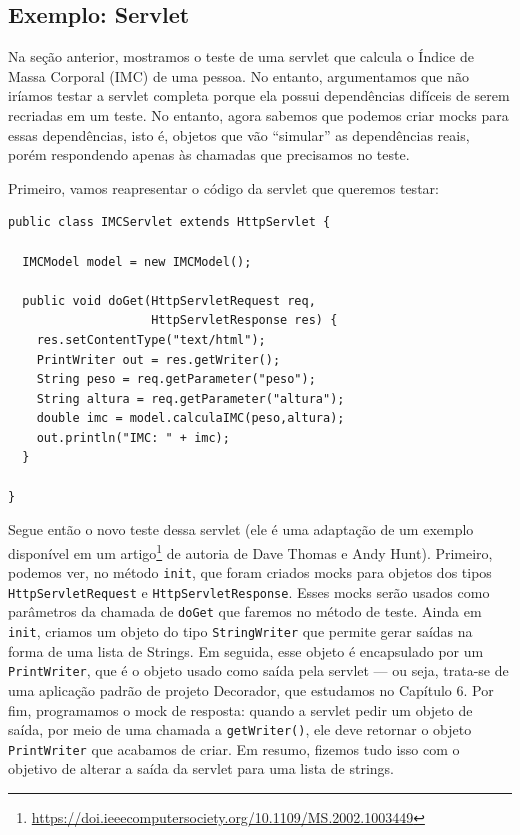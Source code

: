 \documentclass[
  11pt,
  twoside]{book}
\newcommand{\passthrough}[1]{#1}
\DeclareRobustCommand{\href}[2]{#2\footnote{\url{#1}}}
\begin{document}
\hypertarget{exemplo-servlet-1}{%
\subsection{Exemplo: Servlet}\label{exemplo-servlet-1}}

Na seção anterior, mostramos o teste de uma servlet que calcula o Índice
de Massa Corporal (IMC) de uma pessoa. No entanto, argumentamos que não
iríamos testar a servlet completa porque ela possui dependências
difíceis de serem recriadas em um teste. No entanto, agora sabemos que
podemos criar mocks para essas dependências, isto é, objetos que vão
``simular'' as dependências reais, porém respondendo apenas às chamadas
que precisamos no teste.

Primeiro, vamos reapresentar o código da servlet que queremos testar:

\begin{lstlisting}
public class IMCServlet extends HttpServlet {

  IMCModel model = new IMCModel();

  public void doGet(HttpServletRequest req, 
                    HttpServletResponse res) {
    res.setContentType("text/html");
    PrintWriter out = res.getWriter();
    String peso = req.getParameter("peso");
    String altura = req.getParameter("altura");
    double imc = model.calculaIMC(peso,altura);
    out.println("IMC: " + imc);
  }

}
\end{lstlisting}

Segue então o novo teste dessa servlet (ele é uma adaptação de um
exemplo disponível em um
\href{https://doi.ieeecomputersociety.org/10.1109/MS.2002.1003449}{artigo}
de autoria de Dave Thomas e Andy Hunt). Primeiro, podemos ver, no método
\passthrough{\lstinline!init!}, que foram criados mocks para objetos dos
tipos \passthrough{\lstinline!HttpServletRequest!} e
\passthrough{\lstinline!HttpServletResponse!}. Esses mocks serão usados
como parâmetros da chamada de \passthrough{\lstinline!doGet!} que
faremos no método de teste. Ainda em \passthrough{\lstinline!init!},
criamos um objeto do tipo \passthrough{\lstinline!StringWriter!} que
permite gerar saídas na forma de uma lista de Strings. Em seguida, esse
objeto é encapsulado por um \passthrough{\lstinline!PrintWriter!}, que é
o objeto usado como saída pela servlet --- ou seja, trata-se de uma
aplicação padrão de projeto Decorador, que estudamos no Capítulo 6. Por
fim, programamos o mock de resposta: quando a servlet pedir um objeto de
saída, por meio de uma chamada a \passthrough{\lstinline!getWriter()!},
ele deve retornar o objeto \passthrough{\lstinline!PrintWriter!} que
acabamos de criar. Em resumo, fizemos tudo isso com o objetivo de
alterar a saída da servlet para uma lista de strings.
\end{document}
